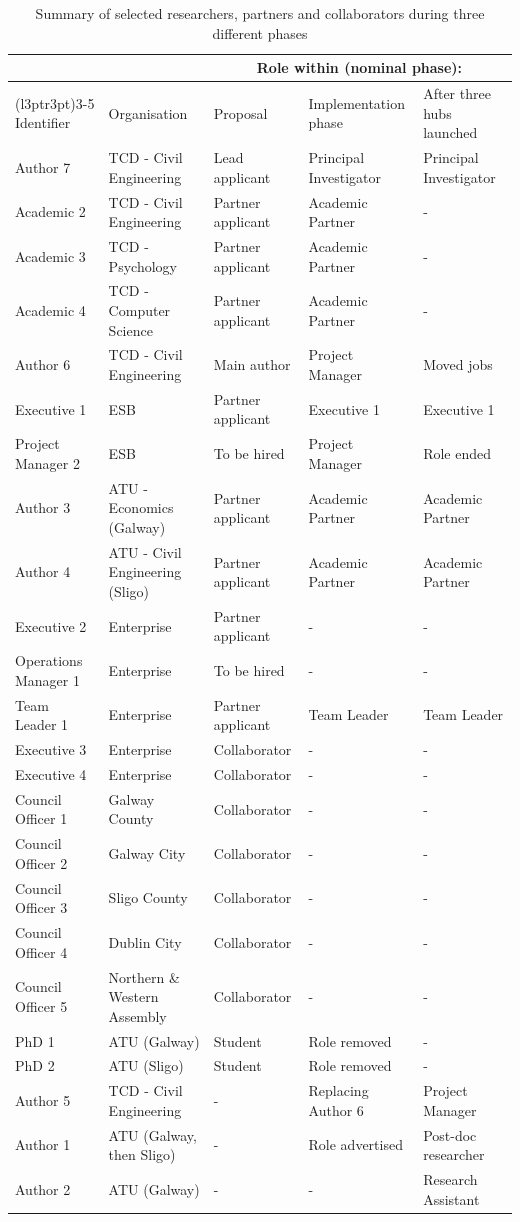 \documentclass[preprint, 3p,
authoryear]{elsarticle} %
\begin{document}
\begin{longtable}[t]{lllll}
\caption{\label{tab:participant_shifts}Summary of selected researchers, partners and collaborators during three different phases}\\
\toprule
\multicolumn{2}{c}{ } & \multicolumn{3}{c}{Role within (nominal phase):} \\
\cmidrule(l{3pt}r{3pt}){3-5}
Identifier & Organisation & Proposal & Implementation phase & After three hubs launched\\
\midrule
Author 7 & TCD - Civil Engineering & Lead applicant & Principal Investigator & Principal Investigator\\
Academic 2 & TCD - Civil Engineering & Partner applicant & Academic Partner & -\\
Academic 3 & TCD - Psychology & Partner applicant & Academic Partner & -\\
Academic 4 & TCD - Computer Science & Partner applicant & Academic Partner & -\\
Author 6 & TCD - Civil Engineering & Main author & Project Manager & Moved jobs\\
\addlinespace
Executive 1 & ESB & Partner applicant & Executive 1 & Executive 1\\
Project Manager 2 & ESB & To be hired & Project Manager & Role ended\\
Author 3 & ATU - Economics (Galway) & Partner applicant & Academic Partner & Academic Partner\\
Author 4 & ATU - Civil Engineering (Sligo) & Partner applicant & Academic Partner & Academic Partner\\
Executive 2 & Enterprise & Partner applicant & - & -\\
\addlinespace
Operations Manager 1 & Enterprise & To be hired & - & -\\
Team Leader 1 & Enterprise & Partner applicant & Team Leader & Team Leader\\
Executive 3 & Enterprise & Collaborator & - & -\\
Executive 4 & Enterprise & Collaborator & - & -\\
Council Officer 1 & Galway County & Collaborator & - & -\\
\addlinespace
Council Officer 2 & Galway City & Collaborator & - & -\\
Council Officer 3 & Sligo County & Collaborator & - & -\\
Council Officer 4 & Dublin City & Collaborator & - & -\\
Council Officer 5 & Northern \& Western Assembly & Collaborator & - & -\\
PhD 1 & ATU (Galway) & Student & Role removed & -\\
\addlinespace
PhD 2 & ATU (Sligo) & Student & Role removed & -\\
Author 5 & TCD - Civil Engineering & - & Replacing Author 6 & Project Manager\\
Author 1 & ATU (Galway, then Sligo) & - & Role advertised & Post-doc researcher\\
Author 2 & ATU (Galway) & - & - & Research Assistant\\
\bottomrule
\end{longtable}
\endgroup{}
\end{document}
